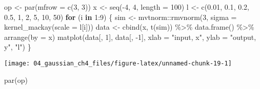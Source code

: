 \documentclass[
]{article}
\newenvironment{Shaded}{\begin{snugshade}}{\end{snugshade}}
\newcommand{\AttributeTok}[1]{\textcolor[rgb]{0.77,0.63,0.00}{#1}}
\newcommand{\ControlFlowTok}[1]{\textcolor[rgb]{0.13,0.29,0.53}{\textbf{#1}}}
\newcommand{\DecValTok}[1]{\textcolor[rgb]{0.00,0.00,0.81}{#1}}
\newcommand{\FloatTok}[1]{\textcolor[rgb]{0.00,0.00,0.81}{#1}}
\newcommand{\FunctionTok}[1]{\textcolor[rgb]{0.00,0.00,0.00}{#1}}
\newcommand{\NormalTok}[1]{#1}
\newcommand{\OtherTok}[1]{\textcolor[rgb]{0.56,0.35,0.01}{#1}}
\newcommand{\SpecialCharTok}[1]{\textcolor[rgb]{0.00,0.00,0.00}{#1}}
\newcommand{\StringTok}[1]{\textcolor[rgb]{0.31,0.60,0.02}{#1}}
\begin{document}
\begin{Shaded}
\begin{Highlighting}[]
\NormalTok{op }\OtherTok{\textless{}{-}} \FunctionTok{par}\NormalTok{(}\AttributeTok{mfrow =} \FunctionTok{c}\NormalTok{(}\DecValTok{3}\NormalTok{, }\DecValTok{3}\NormalTok{))}
\NormalTok{x }\OtherTok{\textless{}{-}} \FunctionTok{seq}\NormalTok{(}\SpecialCharTok{{-}}\DecValTok{4}\NormalTok{, }\DecValTok{4}\NormalTok{, }\AttributeTok{length =} \DecValTok{100}\NormalTok{)}
\NormalTok{l }\OtherTok{\textless{}{-}} \FunctionTok{c}\NormalTok{(}\FloatTok{0.01}\NormalTok{, }\FloatTok{0.1}\NormalTok{, }\FloatTok{0.2}\NormalTok{, }
       \FloatTok{0.5}\NormalTok{, }\DecValTok{1}\NormalTok{, }\DecValTok{2}\NormalTok{, }
       \DecValTok{5}\NormalTok{, }\DecValTok{10}\NormalTok{, }\DecValTok{50}\NormalTok{)}
\ControlFlowTok{for}\NormalTok{ (i }\ControlFlowTok{in} \DecValTok{1}\SpecialCharTok{:}\DecValTok{9}\NormalTok{) \{}
\NormalTok{  sim }\OtherTok{\textless{}{-}}\NormalTok{ mvtnorm}\SpecialCharTok{::}\FunctionTok{rmvnorm}\NormalTok{(}\DecValTok{3}\NormalTok{, }\AttributeTok{sigma =} \FunctionTok{kernel\_mackay}\NormalTok{(}\AttributeTok{scale =}\NormalTok{ l[i]))}
\NormalTok{  data }\OtherTok{\textless{}{-}} \FunctionTok{cbind}\NormalTok{(x, }\FunctionTok{t}\NormalTok{(sim)) }\SpecialCharTok{\%\textgreater{}\%} 
    \FunctionTok{data.frame}\NormalTok{() }\SpecialCharTok{\%\textgreater{}\%}
    \FunctionTok{arrange}\NormalTok{(}\AttributeTok{by =}\NormalTok{ x)}
  \FunctionTok{matplot}\NormalTok{(data[, }\DecValTok{1}\NormalTok{], data[, }\SpecialCharTok{{-}}\DecValTok{1}\NormalTok{], }
          \AttributeTok{xlab =} \StringTok{"input, x"}\NormalTok{, }\AttributeTok{ylab =} \StringTok{"output, y"}\NormalTok{,}
          \StringTok{"l"}\NormalTok{)}
\NormalTok{\}}
\end{Highlighting}
\end{Shaded}

\begin{center}\texttt{[image: 04\_gaussian\_ch4\_files/figure-latex/unnamed-chunk-19-1]} \end{center}

\begin{Shaded}
\begin{Highlighting}[]
\FunctionTok{par}\NormalTok{(op)}
\end{Highlighting}
\end{Shaded}
\end{document}
